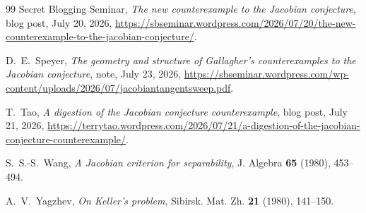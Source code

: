 \documentclass[11pt]{article}
\theoremstyle{plain}
\theoremstyle{definition}
\theoremstyle{remark}
\begin{document}
\begin{thebibliography}{99}
Secret Blogging Seminar,
\emph{The new counterexample to the Jacobian conjecture}, blog post, July 20,
2026,
\url{https://sbseminar.wordpress.com/2026/07/20/the-new-counterexample-to-the-jacobian-conjecture/}.

D.~E.~Speyer,
\emph{The geometry and structure of Gallagher's counterexamples to the Jacobian
conjecture}, note, July 23, 2026,
\url{https://sbseminar.wordpress.com/wp-content/uploads/2026/07/jacobiantangentsweep.pdf}.

T.~Tao,
\emph{A digestion of the Jacobian conjecture counterexample}, blog post, July 21,
2026,
\url{https://terrytao.wordpress.com/2026/07/21/a-digestion-of-the-jacobian-conjecture-counterexample/}.

S.~S.-S.~Wang,
\emph{A Jacobian criterion for separability},
J. Algebra \textbf{65} (1980), 453--494.

A.~V.~Yagzhev,
\emph{On Keller's problem},
Sibirsk. Mat. Zh. \textbf{21} (1980), 141--150.

\end{thebibliography}
\end{document}
